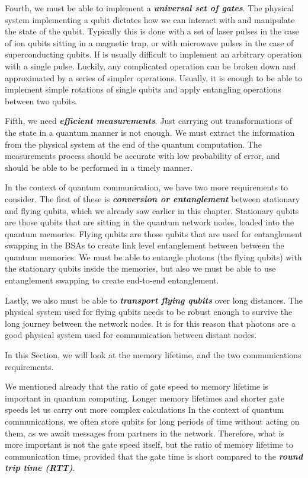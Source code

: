 Fourth, we must be able to implement a \textbf{\emph{universal set of gates}}.
The physical system implementing a qubit dictates how we can interact with and manipulate the state of the qubit.
Typically this is done with a set of laser pulses in the case of ion qubits sitting in a magnetic trap, or with microwave pulses in the case of superconducting qubits.
If is usually difficult to implement an arbitrary operation with a single pulse.
Luckily, any complicated operation can be broken down and approximated by a series of simpler operations.
Usually, it is enough to be able to implement simple rotations of single qubits and apply entangling operations between two qubits.

Fifth, we need \textbf{\emph{efficient measurements}}.
Just carrying out transformations of the state in a quantum manner is not enough.
We must extract the information from the physical system at the end of the quantum computation.
The measurements process should be accurate with low probability of error, and should be able to be performed in a timely manner.

In the context of quantum communication, we have two more requirements to consider.
The first of these is \textbf{\emph{conversion or entanglement }}between stationary and flying qubits, which we already saw earlier in this chapter.
Stationary qubits are those qubits that are sitting in the quantum network nodes, loaded into the quantum memories. 
Flying qubits are those qubits that are used for entanglement swapping in the BSAs to create link level entanglement between between the quantum memories.
We must be able to entangle photons (the flying qubits) with the stationary qubits inside the memories, but also we must be able to use entanglement swapping to create end-to-end entanglement.

Lastly, we also must be able to \textbf{\emph{transport flying qubits}} over long distances.
The physical system used for flying qubits needs to be robust enough to survive the long journey between the network nodes.
It is for this reason that photons are a good physical system used for communication between distant nodes.

In this Section, we will look at the memory lifetime, and the two communications requirements.

We mentioned already that the ratio of gate speed to memory lifetime is important in quantum computing.
Longer memory lifetimes and shorter gate speeds let us carry out more complex calculations
In the context of quantum communications, we often store qubits for long periods of time without acting on them, as we await messages from partners in the network.
Therefore, what is more important is not the gate speed itself, but the ratio of memory lifetime to communication time, 
provided that the gate time is short compared to the \textbf{\emph{round trip time (RTT)}}. 

